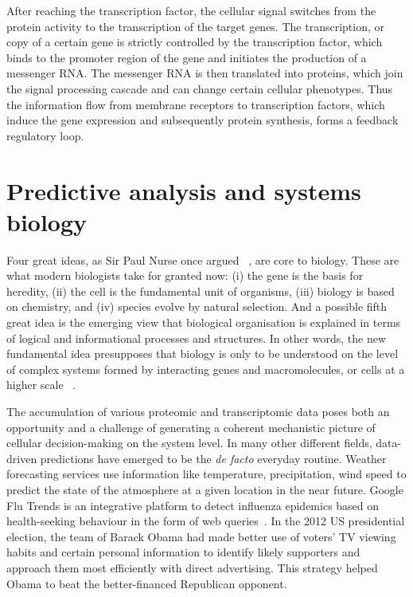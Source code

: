 After reaching the transcription factor, 
the cellular signal switches from the
protein activity to the transcription of the target genes. The transcription,
or copy of a certain gene is strictly controlled by the transcription factor,
which binds to the promoter region of the gene and initiates the production
of a messenger RNA. The messenger RNA is then translated into proteins,
which join the signal processing cascade and can change certain cellular 
phenotypes. Thus the information flow from membrane receptors to transcription
factors, which induce the gene expression and subsequently protein synthesis, 
forms a feedback regulatory loop.

\section{Predictive analysis and systems biology}
Four great ideas, as Sir Paul Nurse once argued~%
\citep{Nurse2003}, are core to biology. These are what
modern biologists take for granted now: (i) the gene is the basis for heredity, (ii) the cell is the fundamental unit of organisms, (iii) biology is based on chemistry, and (iv) species evolve by natural selection. And a possible fifth great 
idea is the emerging view that biological organisation is explained in terms of logical
and informational processes and structures. 
In other words, 
the new fundamental idea presupposes that biology is only to be 
understood
on the level of complex systems formed by interacting genes and macromolecules, or cells at a higher scale~%
\citep{Vidal2009}.

The accumulation of various proteomic and transcriptomic
data poses both an opportunity and a challenge of 
generating a coherent 
mechanistic picture of cellular decision-making on the 
system level. In many
other different fields, data-driven predictions have 
emerged to be the \emph{de facto} everyday routine. Weather
forecasting services use information like temperature, 
precipitation, wind speed to predict the state of the 
atmosphere at a given location in the near future. Google
Flu Trends is an integrative platform to detect influenza
epidemics based on health-seeking behaviour in the form of 
web queries~\citep{Ginsberg2009}. In the 2012 US presidential
election, the team of Barack Obama had made better use of 
voters' TV viewing habits and certain personal information 
to identify likely supporters and
approach them most efficiently with direct advertising. 
This strategy helped Obama to beat the better-financed
Republican opponent.

